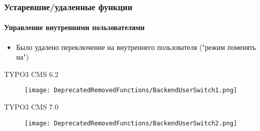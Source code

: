 
\begin{frame}[fragile]
	\frametitle{Устаревшие/удаленные функции}
	\framesubtitle{Управление внутренними пользователями}

	\begin{itemize}
		\item Было удалено переключение на внутреннего пользователя ("режим поменять на")
	\end{itemize}

	\smaller\tabto{1cm}\begingroup\color{typo3red}TYPO3 CMS 6.2\endgroup\normalsize
	\begin{figure}\vspace{-0.4cm}
		\texttt{[image: DeprecatedRemovedFunctions/BackendUserSwitch1.png]}
	\end{figure}

	\smaller\tabto{1cm}\begingroup\color{typo3red}TYPO3 CMS 7.0\endgroup\normalsize
	\begin{figure}\vspace{-0.4cm}
		\texttt{[image: DeprecatedRemovedFunctions/BackendUserSwitch2.png]}
	\end{figure}

\end{frame}


